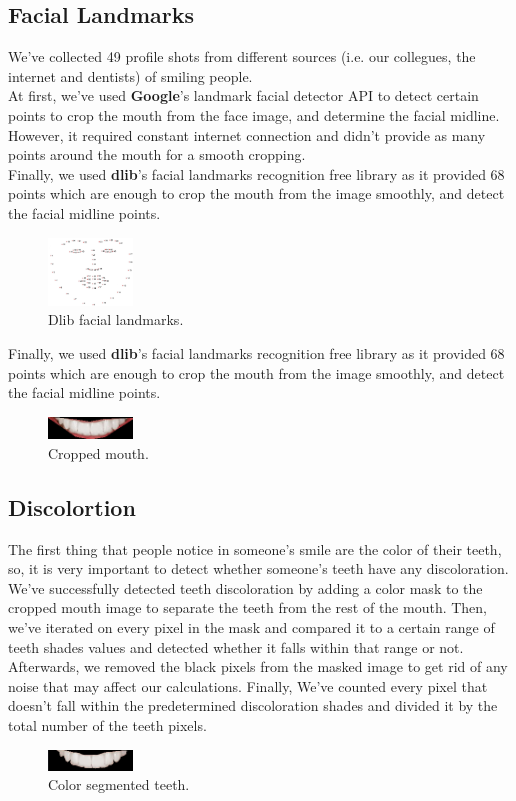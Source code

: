 \documentclass[conference,twocolumn]{IEEEtran}
\begin{document}
\subsection{Facial Landmarks}
 We've collected 49 profile shots from different sources (i.e. our collegues, the internet and dentists) of smiling people.\\
 At first, we've used \textbf{Google}'s landmark facial detector API to detect certain points to crop the mouth from the face image, and determine the facial midline.
 However, it required constant internet connection and didn't provide as many points around the mouth for a smooth cropping.\\
 Finally, we used \textbf{dlib}'s facial landmarks recognition free library as it provided 68 points which are enough to crop the mouth from the image smoothly, and detect the facial midline points.
 \begin{figure}[H]
    \centering
    \includegraphics[width=0.2\textwidth]{facial_landmarks.jpg}
    \caption{Dlib facial landmarks.}
    \label{fig:my_label}
\end{figure}
Finally, we used \textbf{dlib}'s facial landmarks recognition free library as it provided 68 points which are enough to crop the mouth from the image smoothly, and detect the facial midline points.
\begin{figure}[H]
   \centering
   \includegraphics[width=0.2\textwidth]{cropped_mouth.png}
   \caption{Cropped mouth.}
   \label{fig:my_label}
\end{figure}
\subsection{Discolortion}
 The first thing that people notice in someone's smile are the color of their teeth, so, it is very important to detect whether someone's teeth have any discoloration.
 We've successfully detected teeth discoloration by adding a color mask to the cropped mouth image to separate the teeth from the rest of the mouth.
 Then, we've iterated on every pixel in the mask and compared it to a certain range of teeth shades values and detected whether it falls within that range or not.
 Afterwards, we removed the black pixels from the masked image to get rid of any noise that may affect our calculations. Finally, We've counted every pixel that doesn't fall within the predetermined discoloration shades and divided it by the total number of the teeth pixels.
 \begin{figure}[H]
    \centering
    \includegraphics[width=0.2\textwidth]{segmented_teeth.png}
    \caption{Color segmented teeth.}
    \label{fig:my_label}
\end{figure}
\end{document}
